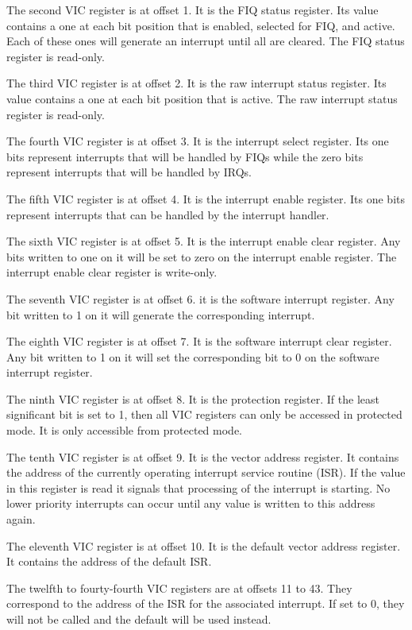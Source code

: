 \documentclass{article}
\begin{document}
The second VIC register is at offset 1. It is the FIQ status register. Its
value contains a one at each bit position that is enabled, selected for FIQ, and
active. Each of these ones will generate an interrupt until all are cleared. The
FIQ status register is read-only.

The third VIC register is at offset 2. It is the raw interrupt status register.
Its value contains a one at each bit position that is active. The raw interrupt
status register is read-only.

The fourth VIC register is at offset 3. It is the interrupt select register. Its
one bits represent interrupts that will be handled by FIQs while the zero bits
represent interrupts that will be handled by IRQs.

The fifth VIC register is at offset 4. It is the interrupt enable register. Its
one bits represent interrupts that can be handled by the interrupt handler.

The sixth VIC register is at offset 5. It is the interrupt enable clear
register. Any bits written to one on it will be set to zero on the interrupt
enable register. The interrupt enable clear register is write-only.

The seventh VIC register is at offset 6. it is the software interrupt register.
Any bit written to 1 on it will generate the corresponding interrupt.

The eighth VIC register is at offset 7. It is the software interrupt clear
register. Any bit written to 1 on it will set the corresponding bit to 0 on the
software interrupt register.

The ninth VIC register is at offset 8. It is the protection register. If the
least significant bit is set to 1, then all VIC registers can only be accessed
in protected mode. It is only accessible from protected mode.

The tenth VIC register is at offset 9. It is the vector address register. It
contains the address of the currently operating interrupt service routine
(ISR). If the value in this register is read it signals that processing of the
interrupt is starting. No lower priority interrupts can occur until any value is
written to this address again.

The eleventh VIC register is at offset 10. It is the default vector address
register. It contains the address of the default ISR.

The twelfth to fourty-fourth VIC registers are at offsets 11 to 43. They
correspond to the address of the ISR for the associated interrupt. If set to 0,
they will not be called and the default will be used instead.
\end{document}
